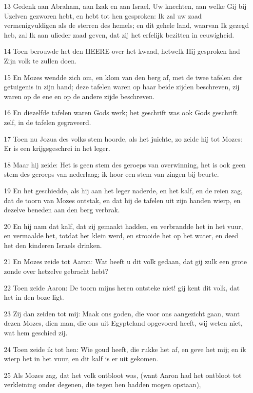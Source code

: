 \par 13 Gedenk aan Abraham, aan Izak en aan Israel, Uw knechten, aan welke Gij bij Uzelven gezworen hebt, en hebt tot hen gesproken: Ik zal uw zaad vermenigvuldigen als de sterren des hemels; en dit gehele land, waarvan Ik gezegd heb, zal Ik aan ulieder zaad geven, dat zij het erfelijk bezitten in eeuwigheid.
\par 14 Toen berouwde het den HEERE over het kwaad, hetwelk Hij gesproken had Zijn volk te zullen doen.
\par 15 En Mozes wendde zich om, en klom van den berg af, met de twee tafelen der getuigenis in zijn hand; deze tafelen waren op haar beide zijden beschreven, zij waren op de ene en op de andere zijde beschreven.
\par 16 En diezelfde tafelen waren Gods werk; het geschrift was ook Gods geschrift zelf, in de tafelen gegraveerd.
\par 17 Toen nu Jozua des volks stem hoorde, als het juichte, zo zeide hij tot Mozes: Er is een krijgsgeschrei in het leger.
\par 18 Maar hij zeide: Het is geen stem des geroeps van overwinning, het is ook geen stem des geroeps van nederlaag; ik hoor een stem van zingen bij beurte.
\par 19 En het geschiedde, als hij aan het leger naderde, en het kalf, en de reien zag, dat de toorn van Mozes ontstak, en dat hij de tafelen uit zijn handen wierp, en dezelve beneden aan den berg verbrak.
\par 20 En hij nam dat kalf, dat zij gemaakt hadden, en verbrandde het in het vuur, en vermaalde het, totdat het klein werd, en strooide het op het water, en deed het den kinderen Israels drinken.
\par 21 En Mozes zeide tot Aaron: Wat heeft u dit volk gedaan, dat gij zulk een grote zonde over hetzelve gebracht hebt?
\par 22 Toen zeide Aaron: De toorn mijns heren ontsteke niet! gij kent dit volk, dat het in den boze ligt.
\par 23 Zij dan zeiden tot mij: Maak ons goden, die voor ons aangezicht gaan, want dezen Mozes, dien man, die ons uit Egypteland opgevoerd heeft, wij weten niet, wat hem geschied zij.
\par 24 Toen zeide ik tot hen: Wie goud heeft, die rukke het af, en geve het mij; en ik wierp het in het vuur, en dit kalf is er uit gekomen.
\par 25 Als Mozes zag, dat het volk ontbloot was, (want Aaron had het ontbloot tot verkleining onder degenen, die tegen hen hadden mogen opstaan),
